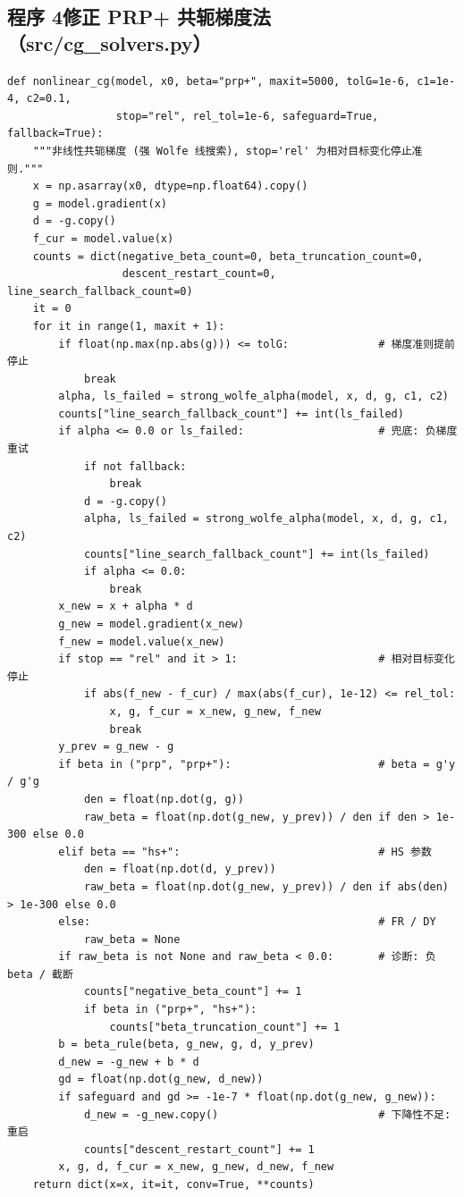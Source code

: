 \documentclass[withoutpreface,bwprint]{cumcmthesis}
\begin{document}
\subsection*{程序 4\quad 修正 PRP+ 共轭梯度法（src/cg\_solvers.py）}

\begin{lstlisting}[style=appcode]
def nonlinear_cg(model, x0, beta="prp+", maxit=5000, tolG=1e-6, c1=1e-4, c2=0.1,
                 stop="rel", rel_tol=1e-6, safeguard=True, fallback=True):
    """非线性共轭梯度 (强 Wolfe 线搜索), stop='rel' 为相对目标变化停止准则."""
    x = np.asarray(x0, dtype=np.float64).copy()
    g = model.gradient(x)
    d = -g.copy()
    f_cur = model.value(x)
    counts = dict(negative_beta_count=0, beta_truncation_count=0,
                  descent_restart_count=0, line_search_fallback_count=0)
    it = 0
    for it in range(1, maxit + 1):
        if float(np.max(np.abs(g))) <= tolG:              # 梯度准则提前停止
            break
        alpha, ls_failed = strong_wolfe_alpha(model, x, d, g, c1, c2)
        counts["line_search_fallback_count"] += int(ls_failed)
        if alpha <= 0.0 or ls_failed:                     # 兜底: 负梯度重试
            if not fallback:
                break
            d = -g.copy()
            alpha, ls_failed = strong_wolfe_alpha(model, x, d, g, c1, c2)
            counts["line_search_fallback_count"] += int(ls_failed)
            if alpha <= 0.0:
                break
        x_new = x + alpha * d
        g_new = model.gradient(x_new)
        f_new = model.value(x_new)
        if stop == "rel" and it > 1:                      # 相对目标变化停止
            if abs(f_new - f_cur) / max(abs(f_cur), 1e-12) <= rel_tol:
                x, g, f_cur = x_new, g_new, f_new
                break
        y_prev = g_new - g
        if beta in ("prp", "prp+"):                       # beta = g'y / g'g
            den = float(np.dot(g, g))
            raw_beta = float(np.dot(g_new, y_prev)) / den if den > 1e-300 else 0.0
        elif beta == "hs+":                               # HS 参数
            den = float(np.dot(d, y_prev))
            raw_beta = float(np.dot(g_new, y_prev)) / den if abs(den) > 1e-300 else 0.0
        else:                                             # FR / DY
            raw_beta = None
        if raw_beta is not None and raw_beta < 0.0:       # 诊断: 负 beta / 截断
            counts["negative_beta_count"] += 1
            if beta in ("prp+", "hs+"):
                counts["beta_truncation_count"] += 1
        b = beta_rule(beta, g_new, g, d, y_prev)
        d_new = -g_new + b * d
        gd = float(np.dot(g_new, d_new))
        if safeguard and gd >= -1e-7 * float(np.dot(g_new, g_new)):
            d_new = -g_new.copy()                         # 下降性不足: 重启
            counts["descent_restart_count"] += 1
        x, g, d, f_cur = x_new, g_new, d_new, f_new
    return dict(x=x, it=it, conv=True, **counts)


\end{lstlisting}
\end{document}
